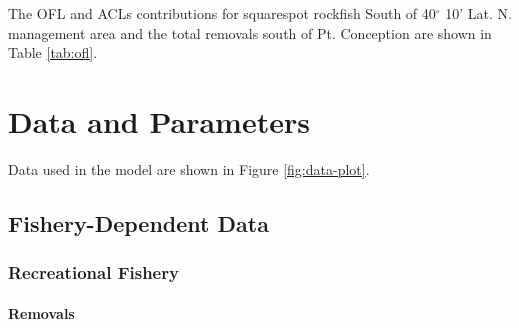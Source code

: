 \documentclass[11pt,
  english,
  a4paper,
]{article}
\begin{document}
\leavevmode\tagmcend\tagstructend\par


The OFL and ACLs contributions for squarespot rockfish South of 40{\(^\circ\)\leavevmode\tagmcend\tagstructend} 10' Lat. N. management area and the total removals south of Pt. Conception are shown in Table \ref{tab:ofl}.

\leavevmode\tagmcend\tagstructend\par


\hypertarget{data-and-parameters}{%
\section{Data and Parameters}\label{data-and-parameters}}

\leavevmode\tagmcend\tagstructend


Data used in the model are shown in Figure \ref{fig:data-plot}.

\leavevmode\tagmcend\tagstructend\par


\hypertarget{fishery-dependent-data}{%
\subsection{Fishery-Dependent Data}\label{fishery-dependent-data}}

\leavevmode\tagmcend\tagstructend


\hypertarget{recreational-fishery}{%
\subsubsection{Recreational Fishery}\label{recreational-fishery}}

\leavevmode\tagmcend\tagstructend


\hypertarget{removals}{%
\paragraph{Removals}\label{removals}}
\end{document}
